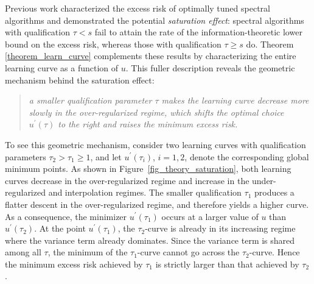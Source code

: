 \documentclass{article}
\theoremstyle{plain}
\theoremstyle{definition}
\theoremstyle{remark}
\begin{document}
\iffalse

{\color{red}
Previous work \citep{zhang2024optimal, lu2024saturation} characterized the excess risk of optimally tuned spectral algorithms and demonstrated the potential \emph{saturation effect}: 
spectral algorithms with qualification \(\tau < s\) fail to attain the rate of the information-theoretic lower bound on the excess risk, whereas those with qualification \(\tau \geq s\) do. 
Theorem \ref{theorem_learn_curve} complements these results by characterizing the entire learning curve as a function of $u$. 
This fuller description reveals the geometric mechanism behind the saturation effect: 
\begin{quote}
    \textit{a smaller qualification parameter $\tau$ makes the learning curve decrease more slowly in the over-regularized regime, which shifts the optimal choice $u^{\prime}(\tau)$ to the right and raises the minimum excess risk.}
\end{quote}






To see this geometric mechanism, consider two learning curves with qualification parameters $\tau_2 > \tau_1 \geq 1$, and let $u^{\prime}(\tau_i)$, $i=1,2$, denote the corresponding global minimum points. 
As shown in Figure~\ref{fig_theory_saturation}, both learning curves decrease in the over-regularized regime and increase in the under-regularized and interpolation regimes. 
The smaller qualification $\tau_1$ produces a flatter descent in the over-regularized regime, and therefore yields a higher curve.
As a consequence, the minimizer $u^{\prime}(\tau_1)$ occurs at a larger value of $u$ than $u^{\prime}(\tau_2)$. 
At the point $u^{\prime}(\tau_1)$, the $\tau_2$-curve is already in its increasing regime where the variance term already dominates. 
Since the variance term is shared among all $\tau$, the minimum of the $\tau_1$-curve cannot go across the $\tau_2$-curve. 
Hence the minimum excess risk achieved by $\tau_1$ is strictly larger than that achieved by $\tau_2$. 

}
\end{document}
